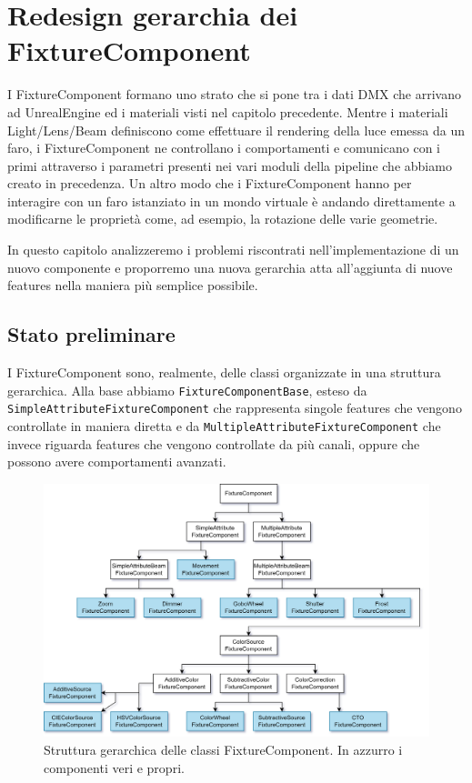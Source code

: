 \documentclass[main.tex]{subfiles}
\begin{document}
\sloppy


\vspace{1.0cm}

\section{Redesign gerarchia dei FixtureComponent}\label{sec:FixtureComponentHierachy}
I FixtureComponent formano uno strato che si pone tra i dati DMX che arrivano ad UnrealEngine ed i materiali visti nel capitolo precedente. Mentre i materiali Light/Lens/Beam definiscono come effettuare il rendering della luce emessa da un faro, i FixtureComponent ne controllano i comportamenti e comunicano con i primi attraverso i parametri presenti nei vari moduli della pipeline che abbiamo creato in precedenza. Un altro modo che i FixtureComponent hanno per interagire con un faro istanziato in un mondo virtuale è andando direttamente a modificarne le proprietà come, ad esempio, la rotazione delle varie geometrie. \newline

In questo capitolo analizzeremo i problemi riscontrati nell'implementazione di un nuovo componente e proporremo una nuova gerarchia atta all'aggiunta di nuove features nella maniera più semplice possibile.

\subsection{Stato preliminare}\label{subsec:3_oldImplementation}
I FixtureComponent sono, realmente, delle classi organizzate in una struttura gerarchica. Alla base abbiamo \lstinline{FixtureComponentBase}, esteso da \lstinline{SimpleAttributeFixtureComponent} che rappresenta singole features che vengono controllate in maniera diretta e da \lstinline{MultipleAttributeFixtureComponent} che invece riguarda features che vengono controllate da più canali, oppure che possono avere comportamenti avanzati.
\begin{figure}[H]
    \centering
    \includegraphics[width=0.9\linewidth]{img/fixtureComponent/FixtureComponentOLD.drawio.png}
    \caption{Struttura gerarchica delle classi FixtureComponent. In azzurro i componenti veri e propri.}
    \label{fig:3_fixtureComponentOld}
\end{figure}
\end{document}
